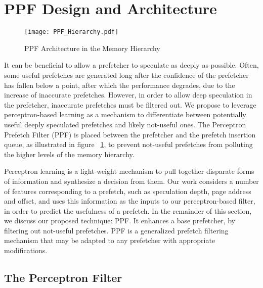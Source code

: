 \section{PPF Design and Architecture}
\label{Arch}

\begin{figure}
  \begin{center}
  \texttt{[image: PPF\_Hierarchy.pdf]}
    \label{fig:PPF_Hierarchy}
  \caption{PPF Architecture in the Memory Hierarchy}
  \end{center}
\end{figure}

It can be beneficial to allow a prefetcher to speculate as deeply as
possible. Often, some useful prefetches are generated long after the
confidence of the prefetcher has fallen below a point, after which the
performance degrades, due to the increase of inaccurate prefetches.  However,
in order to allow deep speculation in the prefetcher, inaccurate prefetches
must be filtered out.  We propose to leverage perceptron-based learning as a
mechanism to differentiate between potentially useful deeply speculated
prefetches and likely not-useful ones. The Perceptron Prefetch Filter (PPF) is
placed between the prefetcher and the prefetch insertion queue, as illustrated
in figure ~\ref{fig:PPF_Hierarchy}, to prevent not-useful prefetches from
polluting the higher levels of the memory hierarchy.

Perceptron learning is a light-weight mechanism to pull together disparate
forms of information and synthesize a decision from them.  Our work considers
a number of features corresponding to a prefetch, such as speculation depth,
page address and offset, and uses this information as the inputs to our
perceptron-based filter, in order to predict the usefulness of a prefetch.  In
the remainder of this section, we discuss our proposed technique: PPF.  It
enhances a base prefetcher, by filtering out not-useful prefetches.  PPF is a
generalized prefetch filtering mechanism that may be adapted to any prefetcher
with appropriate modifications.

\subsection{The Perceptron Filter}
\label{Arch-Perceptron}

